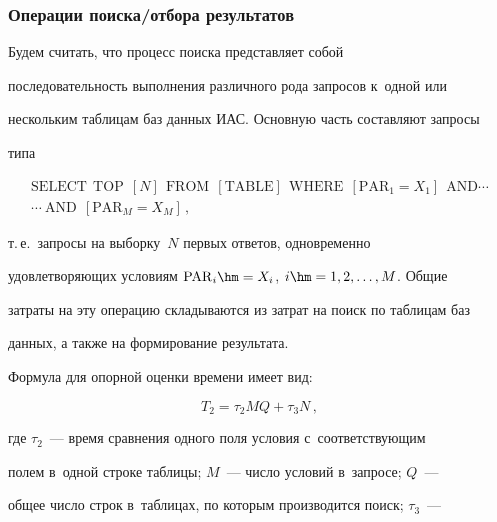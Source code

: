       


      \subsubsection{Операции поиска\!/\!отбора результатов}


      


      Будем считать, что процесс поиска представляет собой 


последовательность выполнения различного рода запросов к~одной или 


нескольким таблицам баз данных ИАС. Основную часть составляют запросы 


типа


 \begin{multline*}


      \mathrm{SELECT\ \ TOP}\ \ [N]\ \ \mathrm{FROM}\ \ [\mathrm{TABLE}]\ \ \mathrm{WHERE}\  \


[\mathrm{PAR}_1=X_1]\ \ \mathrm{AND}\cdots\\


\cdots\ 


      \mathrm{AND}\ \ [\mathrm{PAR}_M=X_M]\,,


\end{multline*}


т.\,е.\ запросы на выборку~$N$ первых ответов, одновременно 


удовлетворяющих условиям $\mathrm{PAR}_i\hm= X_i$, $i\hm=1,2,\ldots, M$. Общие 


затраты на эту операцию складываются из затрат на поиск по таблицам баз 


данных, а также на формирование результата.





      Формула для опорной оценки времени имеет вид:


      \begin{equation*}


      T_2=\tau_2 MQ+\tau_3N\,,




      \end{equation*}


где $\tau_2$~--- время сравнения одного поля условия с~соответствующим 


полем в~одной строке таблицы; $M$~--- число условий в~запросе; $Q$~--- 


общее число строк в~таблицах, по которым производится поиск; $\tau_3$~--- 



